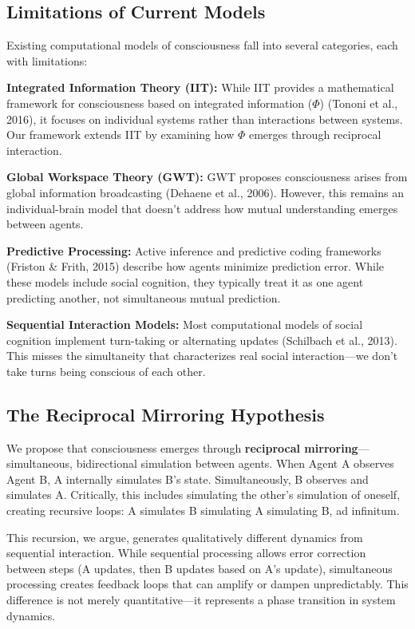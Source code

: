\documentclass[12pt]{article}
\begin{document}
\subsection{Limitations of Current Models}

Existing computational models of consciousness fall into several categories, each with limitations:

\textbf{Integrated Information Theory (IIT):} While IIT provides a mathematical framework for consciousness based on integrated information ($\Phi$) (Tononi et al., 2016), it focuses on individual systems rather than interactions between systems. Our framework extends IIT by examining how $\Phi$ emerges through reciprocal interaction.

\textbf{Global Workspace Theory (GWT):} GWT proposes consciousness arises from global information broadcasting (Dehaene et al., 2006). However, this remains an individual-brain model that doesn't address how mutual understanding emerges between agents.

\textbf{Predictive Processing:} Active inference and predictive coding frameworks (Friston \& Frith, 2015) describe how agents minimize prediction error. While these models include social cognition, they typically treat it as one agent predicting another, not simultaneous mutual prediction.

\textbf{Sequential Interaction Models:} Most computational models of social cognition implement turn-taking or alternating updates (Schilbach et al., 2013). This misses the simultaneity that characterizes real social interaction—we don't take turns being conscious of each other.

\subsection{The Reciprocal Mirroring Hypothesis}

We propose that consciousness emerges through \textbf{reciprocal mirroring}—simultaneous, bidirectional simulation between agents. When Agent A observes Agent B, A internally simulates B's state. Simultaneously, B observes and simulates A. Critically, this includes simulating the other's simulation of oneself, creating recursive loops: A simulates B simulating A simulating B, ad infinitum.

This recursion, we argue, generates qualitatively different dynamics from sequential interaction. While sequential processing allows error correction between steps (A updates, then B updates based on A's update), simultaneous processing creates feedback loops that can amplify or dampen unpredictably. This difference is not merely quantitative—it represents a phase transition in system dynamics.
\end{document}
